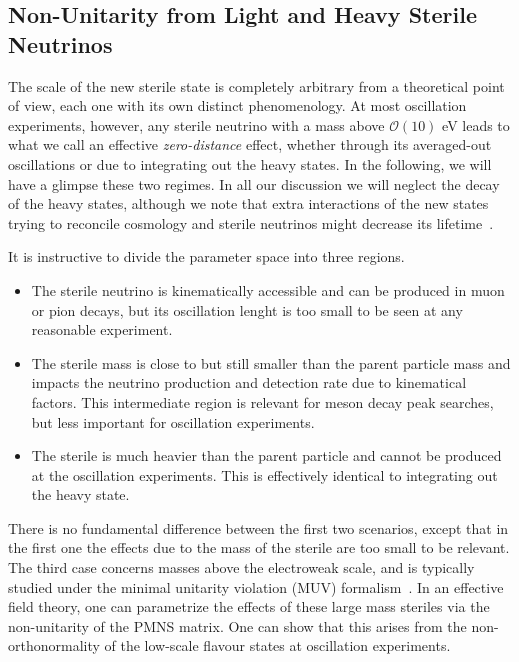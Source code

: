 \subsection{Non-Unitarity from Light and Heavy Sterile Neutrinos}
%

The scale of the new sterile state is completely arbitrary from a theoretical point of view, each one with its own distinct phenomenology. At most oscillation experiments, however, any sterile neutrino with a mass above $\mathcal{O}(10)$ eV leads to what we call an effective \emph{zero-distance} effect, whether through its averaged-out oscillations or due to integrating out the heavy states. In the following, we will have a glimpse these two regimes. In all our discussion we will neglect the decay of the heavy states, although we note that extra interactions of the new states trying to reconcile cosmology and sterile neutrinos might decrease its lifetime~\cite{Mirizzi2014,Chu2015,Archidiacono2014,Archidiacono2016}. 

It is instructive to divide the parameter space into three regions.
%
\begin{itemize}
 \item The sterile neutrino is kinematically accessible and can be produced in muon or pion decays, but its oscillation lenght is too small to be seen at any reasonable experiment.
 \item The sterile mass is close to but still smaller than the parent particle mass and impacts the neutrino production and detection rate due to kinematical factors. This intermediate region is relevant for meson decay peak searches, but less important for oscillation experiments.
 \item The sterile is much heavier than the parent particle and cannot be produced at the oscillation experiments. This is effectively identical to integrating out the heavy state.
\end{itemize}
%
There is no fundamental difference between the first two scenarios, except that in the first one the effects due to the mass of the sterile are too small to be relevant. The third case concerns masses above the electroweak scale, and is typically studied under the minimal unitarity violation (MUV) formalism~\cite{Antusch2006}. In an effective field theory, one can parametrize the effects of these large mass steriles via the non-unitarity of the PMNS matrix. One can show that this arises from the non-orthonormality of the low-scale flavour states at oscillation experiments. 

